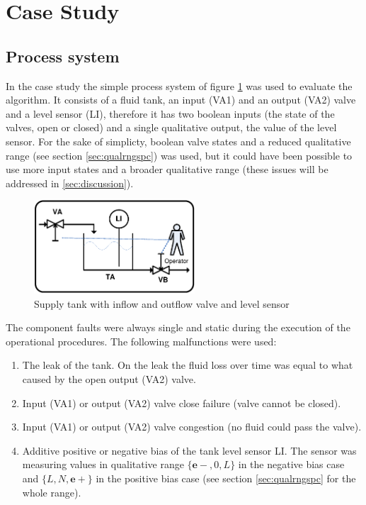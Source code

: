 \documentclass[conference]{IEEEtran}
\begin{document}
\section{Case Study}

\subsection{Process system}
\label{sec:procsys}

In the case study the simple process system of figure \ref{fig:tank} was used to evaluate the algorithm. It consists of a fluid tank, an input (VA1) and an output (VA2) valve and a level sensor (LI), therefore it has two boolean inputs (the state of the valves, open or closed) and a single qualitative output, the value of the level sensor. For the sake of simplicty, boolean valve states and a reduced qualitative range (see section \ref{sec:qualrngspc}) was used, but it could have been possible to use more input states and a broader qualitative range (these issues will be addressed in \ref{sec:discussion}). 

\begin{figure}[h!]
 \begin{center}
  \includegraphics[width=6cm]{Stank.eps}
  \caption {Supply tank with inflow and outflow valve and level sensor}
  \label{fig:tank}
 \end{center}
\end{figure} 

The component faults were always single and static during the execution of the operational procedures. The following malfunctions were used:
\begin{enumerate}
\item The leak of the tank. On the leak the fluid loss over time was equal to what caused by the open output (VA2) valve.
\item Input (VA1) or output (VA2) valve close failure (valve cannot be closed).
\item Input (VA1) or output (VA2) valve congestion (no fluid could pass the valve).
\item Additive positive or negative bias of the tank level sensor LI. The sensor was measuring values in qualitative range $\{\mathbf{e-},0,L\}$ in the negative bias case and $\{L,N,\mathbf{e+}\}$ in the positive bias case (see section \ref{sec:qualrngspc} for the whole range).
\end{enumerate}
\end{document}
